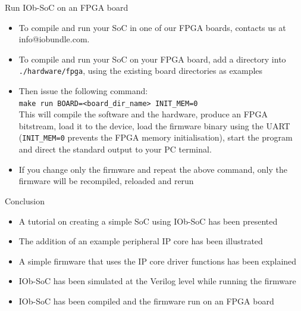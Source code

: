 \documentclass [xcolor=svgnames, t] {beamer}
\begin{document}
\begin{frame}{Run IOb-SoC on an FPGA board}
\begin{itemize}
\item To compile and run your SoC in one of our FPGA boards, contacts us at info@iobundle.com.
\item To compile and run your SoC on your FPGA board, add a directory into {\tt ./hardware/fpga},
  using the existing board directories as examples
\item Then issue the following command:\\
  {\tt make run BOARD=<board\_dir\_name> INIT\_MEM=0}\\
  This will compile the software and the hardware, produce an FPGA bitstream,
  load it to the device, load the firmware binary using the UART ({\tt INIT\_MEM=0} prevents the FPGA memory initialisation), start the
  program and direct the standard output to your PC terminal.
\item If you change only the firmware and repeat the above command, only the
  firmware will be recompiled, reloaded and rerun
\end{itemize}
\end{frame}

\begin{frame}{Conclusion}  
  \begin{itemize}
  \item A tutorial on creating a simple SoC using IOb-SoC has been presented
  \item The addition of an example peripheral IP core has been illustrated
  \item A simple firmware that uses the IP core driver functions has been explained
  \item IOb-SoC has been simulated at the Verilog level while running the firmware
  \item IOb-SoC has been compiled and the firmware run on an FPGA board
  \end{itemize}
\end{frame}

\end{document}

